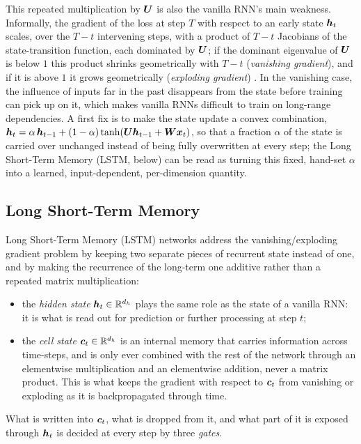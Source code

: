 This repeated multiplication by $\bm{U}$ is also the vanilla RNN's main weakness. Informally, the gradient of the loss at step $T$ with respect to an early state $\bm{h}_t$ scales, over the $T-t$ intervening steps, with a product of $T-t$ Jacobians of the state-transition function, each dominated by $\bm{U}$; if the dominant eigenvalue of $\bm{U}$ is below $1$ this product shrinks geometrically with $T-t$ (\emph{vanishing gradient}), and if it is above $1$ it grows geometrically (\emph{exploding gradient}) \cite{pascanu2013difficulty}. In the vanishing case, the influence of inputs far in the past disappears from the state before training can pick up on it, which makes vanilla RNNs difficult to train on long-range dependencies. A first fix is to make the state update a convex combination, $\bm{h}_t = \alpha\, \bm{h}_{t-1} + (1-\alpha) \tanh(\bm{U}\bm{h}_{t-1} + \bm{W}\bm{x}_t)$, so that a fraction $\alpha$ of the state is carried over unchanged instead of being fully overwritten at every step; the Long Short-Term Memory (LSTM, below) \cite{hochreiter1997lstm} can be read as turning this fixed, hand-set $\alpha$ into a learned, input-dependent, per-dimension quantity.

\subsection{Long Short-Term Memory}

Long Short-Term Memory (LSTM) networks address the vanishing/exploding gradient problem by keeping two separate pieces of recurrent state instead of one, and by making the recurrence of the long-term one additive rather than a repeated matrix multiplication:
\begin{itemize}
    \item the \emph{hidden state} $\bm{h}_t \in \mathbb{R}^{d_h}$ plays the same role as the state of a vanilla RNN: it is what is read out for prediction or further processing at step $t$;
    \item the \emph{cell state} $\bm{c}_t \in \mathbb{R}^{d_h}$ is an internal memory that carries information across time-steps, and is only ever combined with the rest of the network through an elementwise multiplication and an elementwise addition, never a matrix product. This is what keeps the gradient with respect to $\bm{c}_t$ from vanishing or exploding as it is backpropagated through time.
\end{itemize}
What is written into $\bm{c}_t$, what is dropped from it, and what part of it is exposed through $\bm{h}_t$ is decided at every step by three \emph{gates}.

